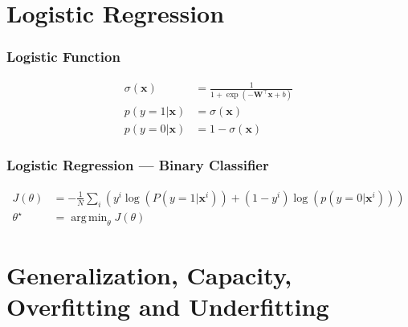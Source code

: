 \documentclass{beamer}
\DeclareMathOperator*{\argmin}{arg\,min}
\begin{document}
\section{Logistic Regression}

\begin{frame}
  \frametitle{Logistic Function}

  \begin{align*}
    \sigma(\mathbf{x})&=\frac{1}{1+\exp(-\mathbf{W}^{\top}\mathbf{x}+b)} \\
    p(y=1|\mathbf{x})&=\sigma(\mathbf{x})\\
    p(y=0|\mathbf{x})&=1-\sigma(\mathbf{x})
  \end{align*}
\end{frame}

\begin{frame}
  \frametitle{Logistic Regression --- Binary Classifier}

  \begin{align*}
    J(\theta)&=-\frac{1}{N}\sum_{i}\left(y^{i}\log(P(y=1|\mathbf{x}^{i}))+(1-y^{i})\log(p(y=0|\mathbf{x}^{i}))\right) \\
    \theta^{\star}&=\argmin_{\theta}J(\theta)
  \end{align*}
\end{frame}

%
%
%
%

\section{Generalization, Capacity, Overfitting and Underfitting}
\end{document}
